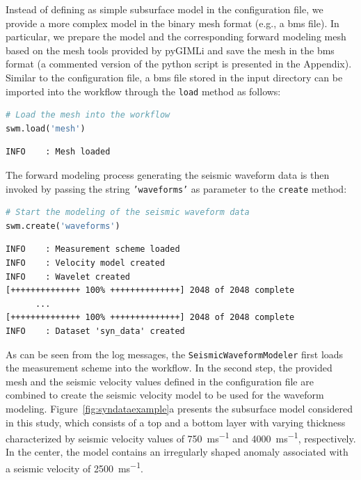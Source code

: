 \documentclass[a4paper,fleqn]{cas-sc}
\begin{document}
Instead of defining as simple subsurface model in the configuration file, we provide a more complex model in the binary mesh format (e.g., a bms file). In particular, we prepare the model and the corresponding forward modeling mesh based on the mesh tools provided by pyGIMLi and save the mesh in the bms format (a commented version of the python script is presented in the Appendix). Similar to the configuration file, a bms file stored in the input directory can be imported into the workflow through the \texttt{load} method as follows:
\begin{lstlisting}[language=Python, firstnumber=8]
# Load the mesh into the workflow
swm.load('mesh')
\end{lstlisting}
\begin{footnotesize}
\begin{verbatim}
INFO    : Mesh loaded
\end{verbatim}
\end{footnotesize}
The forward modeling process generating the seismic waveform data is then invoked by passing the string \texttt{'waveforms'} as parameter to the \texttt{create} method:
\begin{lstlisting}[language=Python, firstnumber=10]
# Start the modeling of the seismic waveform data
swm.create('waveforms')
\end{lstlisting}
\begin{footnotesize}
\begin{verbatim}
INFO    : Measurement scheme loaded
INFO    : Velocity model created
INFO    : Wavelet created
[++++++++++++++ 100% ++++++++++++++] 2048 of 2048 complete
      ...
[++++++++++++++ 100% ++++++++++++++] 2048 of 2048 complete
INFO    : Dataset 'syn_data' created
\end{verbatim}
\end{footnotesize}
As can be seen from the log messages, the \texttt{SeismicWaveformModeler} first loads the measurement scheme into the workflow. In the second step, the provided mesh and the seismic velocity values defined in the configuration file are combined to create the seismic velocity model to be used for the waveform modeling.
Figure~\ref{fig:syndataexample}a presents the subsurface model considered in this study, which consists of a top and a bottom layer with varying thickness characterized by seismic velocity values of \qty{750}{ms^{-1}} and \qty{4000}{ms^{-1}}, respectively. In the center, the model contains an irregularly shaped anomaly associated with a seismic velocity of \qty{2500}{ms^{-1}}.
\end{document}
